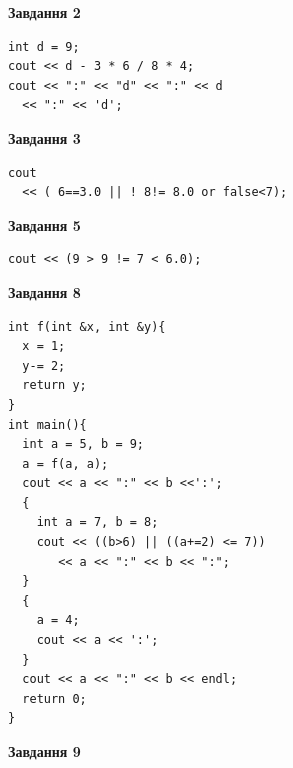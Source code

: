 \documentclass[12pt, ukrainian]{article}
\begin{document}
{\begin {large}
\begin{minipage}[t]{7.0cm}
\end{minipage}
\vline \hspace{1mm}
\begin{minipage}[t]{11.0cm}

\begin{center}
\textbf{Завдання 2}
\end{center}
\vspace{-8mm}

\begin{verbatim}
int d = 9;
cout << d - 3 * 6 / 8 * 4;
cout << ":" << "d" << ":" << d 
  << ":" << 'd';
\end{verbatim}



\begin{center}
\textbf{Завдання 3}
\end{center}
\vspace{-8mm}

\begin{verbatim}
cout 
  << ( 6==3.0 || ! 8!= 8.0 or false<7);
\end{verbatim}



\begin{center}
\textbf{Завдання 5}
\end{center}
\vspace{-8mm}

\begin{verbatim}
cout << (9 > 9 != 7 < 6.0);
\end{verbatim}



\begin{center}
\textbf{Завдання 8}
\end{center}
\vspace{-8mm}

\begin{verbatim}
int f(int &x, int &y){
  x = 1;
  y-= 2;
  return y;
}
int main(){
  int a = 5, b = 9;
  a = f(a, a);
  cout << a << ":" << b <<':';
  {
    int a = 7, b = 8;
    cout << ((b>6) || ((a+=2) <= 7))
       << a << ":" << b << ":";
  }
  {
    a = 4;
    cout << a << ':';
  }
  cout << a << ":" << b << endl;
  return 0;
}
\end{verbatim}

\end{minipage}


\begin{minipage}[t]{7.0cm}

\begin{center}
\textbf{Завдання 9}
\end{center}
\vspace{-8mm}


\end{minipage}
\end{large}}
\end{document}
